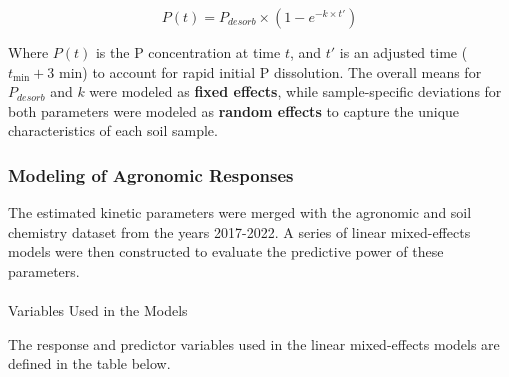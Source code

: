 \documentclass[
  a4paper,
]{article}
\makeatletter
\let\oldparagraph\paragraph
\renewcommand{\paragraph}{
    \@ifstar
      \xxxParagraphStar
      \xxxParagraphNoStar
  }
\newcommand{\xxxParagraphStar}[1]{\oldparagraph*{#1}\mbox{}}
\newcommand{\xxxParagraphNoStar}[1]{\oldparagraph{#1}\mbox{}}
\makeatother
\begin{document}
\[ P(t) = P_{desorb} \times (1 - e^{-k \times t'}) \]

Where \(P(t)\) is the P concentration at time \(t\), and \(t'\) is an
adjusted time (\(t_\text{min} + 3\) min) to account for rapid initial P
dissolution. The overall means for \(P_{desorb}\) and \(k\) were modeled
as \textbf{fixed effects}, while sample-specific deviations for both
parameters were modeled as \textbf{random effects} to capture the unique
characteristics of each soil sample.

\subsubsection{Modeling of Agronomic
Responses}\label{modeling-of-agronomic-responses}

The estimated kinetic parameters were merged with the agronomic and soil
chemistry dataset from the years 2017-2022. A series of linear
mixed-effects models were then constructed to evaluate the predictive
power of these parameters.

\paragraph{Variables Used in the
Models}\label{variables-used-in-the-models}

The response and predictor variables used in the linear mixed-effects
models are defined in the table below.
\end{document}
